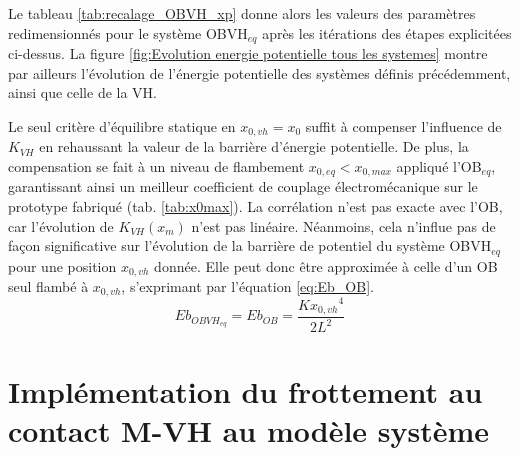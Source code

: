 \begin{table}[!htbp]
	\centering
        \caption{Paramètres des système OBVH$_{eq}$ redimensionné}
        \label{tab:recalage_OBVH_xp}
\end{table}  
Le tableau \ref{tab:recalage_OBVH_xp} donne alors les valeurs des paramètres redimensionnés pour le système OBVH$_{eq}$ après les itérations des étapes explicitées ci-dessus. La figure \ref{fig:Evolution energie potentielle tous les systemes} montre par ailleurs l'évolution de l'énergie potentielle des systèmes définis précédemment, ainsi que celle de la VH.

Le seul critère d'équilibre statique en $x_{0,vh} = x_0$ suffit à compenser l'influence de $K_{VH}$ en rehaussant la valeur de la barrière d'énergie potentielle. De plus, la compensation se fait à un niveau de flambement $x_{0,eq} < x_{0,max}$ appliqué l'OB$_{eq}$, garantissant ainsi un meilleur coefficient de couplage électromécanique sur le prototype fabriqué (tab. \ref{tab:x0max}). La corrélation n'est pas exacte avec l'OB, car l'évolution de $K_{VH}(x_m)$ n'est pas linéaire. Néanmoins, cela n'influe pas de façon significative sur l'évolution de la barrière de potentiel du système OBVH$_{eq}$ pour une position $x_{0,vh}$ donnée. Elle peut donc être approximée à celle d'un OB seul flambé à $x_{0,vh}$, s'exprimant par l'équation \ref{eq:Eb_OB}.
\begin{equation}
	Eb_{OBVH_{eq}} = Eb_{OB} = \dfrac{ K {x_{0,vh}}^4 }{ 2L^2 }
	\label{eq:Eb_OB}
\end{equation}
\section{Implémentation du frottement au contact M-VH au modèle système}
\label{subsec:4.3.4_Implementation du frottement au contact M-VH au modele systeme}
